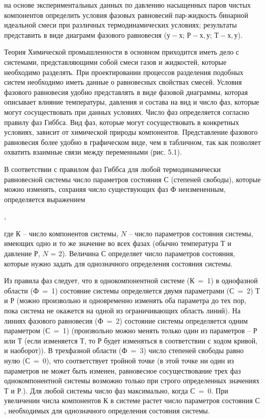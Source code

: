 
\goal на основе экспериментальных данных по давлению насыщенных паров чистых компонентов определить условия фазовых равновесий пар-жидкость бинарной идеальной смеси при различных термодинамических условиях; результаты представить в виде диаграмм фазового равновесия ($у-х$; $Р-х, у$; $Т-х, у$).

Теория
Химической промышленности в основном приходится иметь дело с системами, представляющими собой смеси газов и жидкостей, которые необходимо разделять. При проектировании процессов разделения подобных систем необходимо иметь данные о равновесных свойствах смесей. Условия фазового равновесия удобно представлять в виде фазовой диаграммы, которая описывает влияние температуры, давления и состава на вид и число фаз, которые могут сосуществовать при данных условиях. Число фаз определяется согласно правилу фаз Гиббса. Вид фаз, которые могут сосуществовать в конкретных условиях, зависит от химической природы компонентов. Представление фазового равновесия более удобно в графическом виде, чем в табличном, так как позволяет охватить взаимные связи между переменными (рис. 5.1).

В соответствии с правилом фаз Гиббса для любой термодинамически равновесной системы число параметров состояния $С$ (степеней свободы), которые можно изменять, сохраняя число существующих фаз $Ф$ неизмененным, определяется выражением

,

где $К$ – число компонентов системы, $N$ – число параметров состояния системы, имеющих одно и то же значение во всех фазах (обычно температура $Т$ и давление $Р$, $N$ = 2). Величина $С$ определяет число параметров состояния, которые нужно задать для однозначного определения состояния системы.

Из правила фаз следует, что в однокомпонентной системе ($К$ = 1) в однофазной области ($Ф$ = 1) состояние системы определяется двумя параметрами ($С$ = 2) $Т$ и $Р$ (можно произвольно и одновременно изменять оба параметра до тех пор, пока система не окажется на одной из ограничивающих область линий). На линиях фазового равновесия ($Ф$ = 2) состояние системы определяется одним параметром ($С$ = 1) (произвольно можно менять только один из параметров – $Р$ или $Т$ (если изменяется $Т$, то $Р$ будет изменяться в соответствии с ходом кривой, и наоборот)). В трехфазной области ($Ф$ = 3) число степеней свободы равно нулю ($С$ = 0), что соответствует тройной точке (в этой точке ни один из параметров не может быть изменен, равновесное сосуществование трех фаз однокомпонентной системы возможно только при строго определенных значениях $Т$ и $Р$.). Для любой системы число фаз максимально, когда $С$ = 0. При увеличении числа компонентов $К$ в системе растет число параметров состояния $С$, необходимых для однозначного определения состояния системы.


